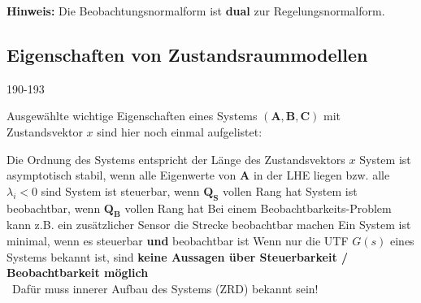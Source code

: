\textbf{Hinweis:} Die Beobachtungsnormalform ist \textbf{dual} zur Regelungsnormalform.


\subsection{Eigenschaften von Zustandsraummodellen}{190-193}

Ausgewählte wichtige Eigenschaften eines Systems $(\bm{A}, \bm{B}, \bm{C})$ mit Zustandsvektor $x$ sind hier noch einmal aufgelistet:

\smallskip

\begin{outline}
    \1 Die Ordnung des Systems entspricht der Länge des Zustandsvektors $x$
    \1 System ist asymptotisch stabil, wenn alle Eigenwerte von $\bm{A}$ in der LHE liegen bzw. alle
        $\lambda_i < 0$ sind 
    \1 System ist steuerbar, wenn $\bm{Q_S}$ vollen Rang hat
    \1 System ist beobachtbar, wenn $\bm{Q_B}$ vollen Rang hat
        \2 Bei einem Beobachtbarkeits-Problem kann z.B. ein zusätzlicher Sensor die Strecke beobachtbar machen
    \1 Ein System ist minimal, wenn es steuerbar \textbf{und} beobachtbar ist
    \1 Wenn nur die UTF $G(s)$ eines Systems bekannt ist, sind \textbf{keine Aussagen über Steuerbarkeit / Beobachtbarkeit möglich} \\
        \textrightarrow\ Dafür muss innerer Aufbau des Systems (ZRD) bekannt sein!
\end{outline}



